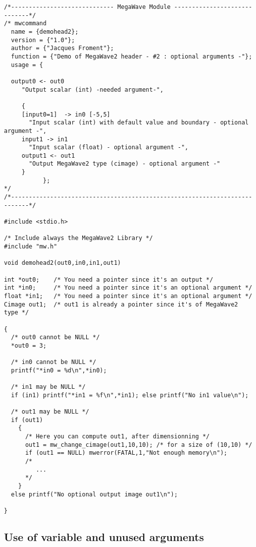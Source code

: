 {\small
\begin{verbatim} 
/*----------------------------- MegaWave Module -----------------------------*/
/* mwcommand
  name = {demohead2};
  version = {"1.0"};
  author = {"Jacques Froment"};
  function = {"Demo of MegaWave2 header - #2 : optional arguments -"};
  usage = {

  output0 <- out0    
     "Output scalar (int) -needed argument-",

     {
     [input0=1]  -> in0 [-5,5]
       "Input scalar (int) with default value and boundary - optional argument -",
     input1 -> in1 
       "Input scalar (float) - optional argument -",
     output1 <- out1
       "Output MegaWave2 type (cimage) - optional argument -"
     }
           };
*/
/*---------------------------------------------------------------------------*/

#include <stdio.h>

/* Include always the MegaWave2 Library */
#include "mw.h"

void demohead2(out0,in0,in1,out1)

int *out0;    /* You need a pointer since it's an output */
int *in0;     /* You need a pointer since it's an optional argument */
float *in1;   /* You need a pointer since it's an optional argument */
Cimage out1;  /* out1 is already a pointer since it's of MegaWave2 type */

{
  /* out0 cannot be NULL */
  *out0 = 3;

  /* in0 cannot be NULL */
  printf("*in0 = %d\n",*in0);

  /* in1 may be NULL */
  if (in1) printf("*in1 = %f\n",*in1); else printf("No in1 value\n");

  /* out1 may be NULL */
  if (out1) 
    {
      /* Here you can compute out1, after dimensionning */
      out1 = mw_change_cimage(out1,10,10); /* for a size of (10,10) */
      if (out1 == NULL) mwerror(FATAL,1,"Not enough memory\n");
      /*
         ...
      */
    }
  else printf("No optional output image out1\n");

}
\end{verbatim} %
}

\subsection{Use of variable and unused arguments}
\label{header_examples_var-unused}

